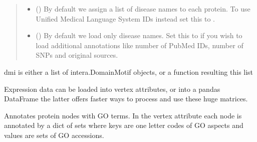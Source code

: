 \documentclass[letterpaper,10pt,english]{sphinxmanual}
\begin{document}
\begin{fulllineitems}
\begin{fulllineitems}
\begin{quote}
\begin{description}
\begin{itemize}
\item {} 
 () \textendash{} By default we assign a list of disease names to
each protein. To use Unified Medical Language System IDs instead
set this to .

\item {} 
 () \textendash{} By default we load only disease names. Set this
to  if you wish to load additional annotations like number
of PubMed IDs, number of SNPs and original sources.

\end{itemize}

\end{description}\end{quote}

\end{fulllineitems}


\begin{fulllineitems}
\label{\detokenize{main:pypath.main.PyPath.load_dmi}}
dmi is either a list of intera.DomainMotif objects,
or a function resulting this list

\end{fulllineitems}


\begin{fulllineitems}
\label{\detokenize{main:pypath.main.PyPath.load_expression}}
Expression data can be loaded into vertex attributes,
or into a pandas DataFrame \textendash{} the latter offers faster
ways to process and use these huge matrices.

\end{fulllineitems}


\begin{fulllineitems}
\label{\detokenize{main:pypath.main.PyPath.load_go}}
Annotates protein nodes with GO terms. In the  vertex
attribute each node is annotated by a dict of sets where keys are
one letter codes of GO aspects and values are sets of GO accessions.


\end{fulllineitems}
\end{fulllineitems}
\end{document}
